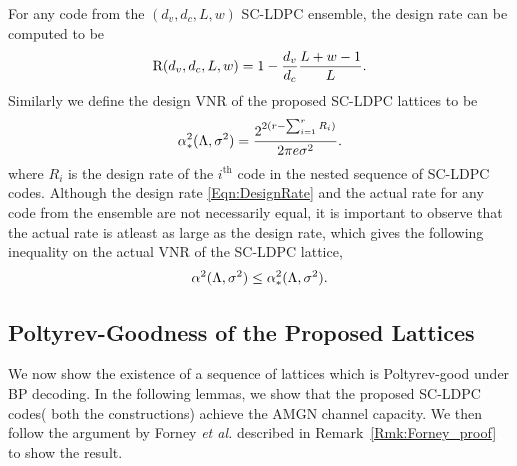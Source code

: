 \documentclass[journal,draftcls,onecolumn,12pt,twoside]{IEEEtran}
\begin{document}
\begin{Discussion}
For any code from the $(d_{v},d_{c},L,w)$ SC-LDPC ensemble, the design rate can be computed to be 
\begin{align}
\text{R}(d_{v},d_{c},L,w)=1-\frac{d_{v}}{d_{c}}\frac{L+w-1}{L}.
\label{Eqn:DesignRate}
\end{align}
Similarly we define the design VNR of the proposed SC-LDPC lattices to be 
\begin{align*}
\alpha^{2}_{*}(\Lambda,\sigma^{2})=\frac{2^{2(r-\sum_{i=1}^{r}R_{i})}}{2\pi e\sigma^{2}}.
\end{align*}
where $R_{i}$ is the design rate of the $i^{\text{th}}$ code in the nested sequence of SC-LDPC codes. Although the design rate \eqref{Eqn:DesignRate} and the actual rate for any code from the ensemble are not necessarily equal, it is important to observe that the actual rate is atleast as large as the design rate, which gives the following inequality on the actual VNR of the SC-LDPC lattice,
\begin{align}
\alpha^{2}(\Lambda,\sigma^{2})\leq \alpha^{2}_{*}(\Lambda,\sigma^{2}).
\label{Eqn:VNRInequality}
\end{align}
\end{Discussion}


\subsection{Poltyrev-Goodness of the Proposed Lattices}
We now show the existence of a sequence of lattices which is Poltyrev-good under BP decoding. In the following lemmas, we show that the proposed SC-LDPC codes( both the constructions) achieve the AMGN channel capacity. We then follow the argument by Forney \textit{et al.} described in Remark~\ref{Rmk:Forney_proof} to show the result.
\end{document}
